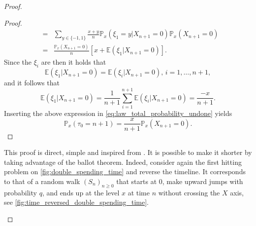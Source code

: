 \begin{proof}
\begin{proof}
\begin{eqnarray}
&=&\sum_{y\in\{-1,1\}}\frac{x+y}{n}\mathbb{P}_{x}(\xi_1 = y|X_{n+1} = 0)\mathbb{P}_x(X_{n+1} = 0)\nonumber\\
&=&\frac{\mathbb{P}_x(X_{n+1} = 0)}{n}\left[x+\mathbb{E}(\xi_1|X_{n+1}=0)\right].\label{eq:law_total_probability_undone}
\end{eqnarray}
Since the $\xi_i$ are \iid then it holds that 
$$
\mathbb{E}(\xi_1|X_{n+1}=0) = \mathbb{E}(\xi_i|X_{n+1}=0)\text{, } i = 1, \ldots, n+1,
$$
and it follows that 
$$
\mathbb{E}(\xi_1|X_{n+1}=0) = \frac{1}{n+1}\sum_{i =1}^{n+1}\mathbb{E}(\xi_i|X_{n+1}=0) = \frac{-x}{n+1}.
$$
Inserting the above expression in \eqref{eq:law_total_probability_undone} yields 
$$
\mathbb{P}_x(\tau_0 = n+1) = \frac{x}{n+1}\mathbb{P}_x(X_{n+1} = 0).
$$
\end{proof}
\begin{remark}
This proof is direct, simple and inspired from \citet{Hofstad2008}. It is possible to make it shorter by taking advantage of the ballot theorem. Indeed, consider again the first hitting problem on \cref{fig:double_spending_time} and reverse the timeline. It corresponds to that of a random walk $(S_n)_{n\geq0}$ that starts at $0$, make upward jumps with probability $q$, and ends up at the level $x$ at time $n$ without crossing the $X$ axis, see \cref{fig:time_reversed_double_spending_time}.
\begin{figure}[ht!]
\begin{center}
\end{center}
\end{figure}
\end{remark}
\end{proof}
